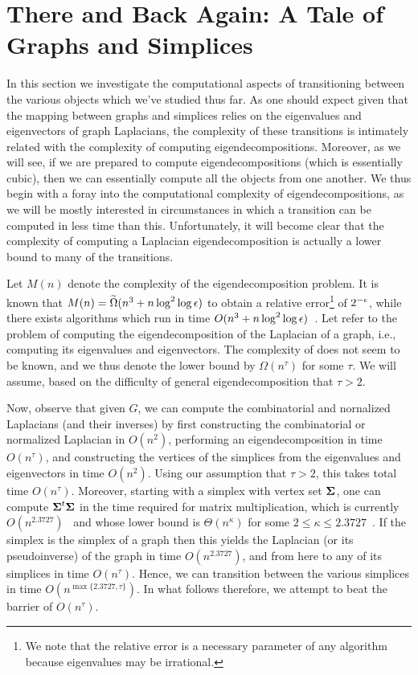 \section{There and Back Again: A Tale of Graphs and Simplices}
In this section we investigate the computational aspects of transitioning between the various objects which we've studied thus far. As one should expect given that the mapping between graphs and simplices relies on the  eigenvalues and eigenvectors of graph  Laplacians, the complexity of these transitions is intimately related with the complexity of computing  eigendecompositions. 
Moreover, as we will see, if we are prepared to compute  eigendecompositions (which is essentially cubic), then we can essentially compute all the objects from one another. We thus begin  with a foray into the computational complexity of eigendecompositions, as we will be mostly  interested in circumstances in which a transition can be computed in less  time than this. Unfortunately, it will become clear that the complexity of  computing a Laplacian eigendecomposition is actually a lower bound to many of the transitions. 
 
Let $M(n)$ denote the complexity of the eigendecomposition problem. It is known that  $M(n)=\widetilde{\Omega}(n^3 + n\log^2 \log \epsilon)$ to obtain a relative error\footnote{We note that the relative error is a necessary parameter of any algorithm because eigenvalues may be irrational.} of $2^{-\epsilon}$, while there exists algorithms which run in time $O(n^3 + n\log^2 \log \epsilon)$~\cite{pan1999complexity}.  
Let \lapdecomp refer to the problem of computing the eigendecomposition of the Laplacian of a graph, i.e., computing its eigenvalues and eigenvectors. The complexity of \lapdecomp does not seem to be known,  and we thus denote the lower bound by $\Omega(n^\tau)$ for some $\tau$. We will assume, based on the difficulty of general eigendecomposition that $\tau>2$. 


Now, observe that given $G$, we can compute the combinatorial and nornalized Laplacians (and their inverses) by first constructing the combinatorial or normalized Laplacian in $O(n^2)$, performing an eigendecomposition in time $O(n^\tau)$, and constructing the vertices of the simplices from the eigenvalues and eigenvectors in time $O(n^2)$. Using our  assumption that $\tau>2$, this takes total time $O(n^\tau)$.  Moreover, starting with a simplex with vertex set $\boldsymbol{\Sigma}$, one can compute $\boldsymbol{\Sigma}^t\boldsymbol{\Sigma}$ in the time required for matrix multiplication, which is currently $O(n^{2.3727})$~\cite{williams2012multiplying} and whose lower bound is $\Theta(n^\kappa)$ for some $2\leq \kappa\leq 2.3727$~\cite{stothers2010complexity}. If the simplex is the simplex of a graph then this yields the Laplacian (or its pseudoinverse) of the graph in time $O(n^{2.3727})$,  and from here to any of its simplices  in time $O(n^\tau)$. Hence, we can transition between the various simplices in time $O(n^{\max\{2.3727,\tau\}})$.  In what follows therefore, we attempt to beat the barrier of $O(n^\tau)$. 

